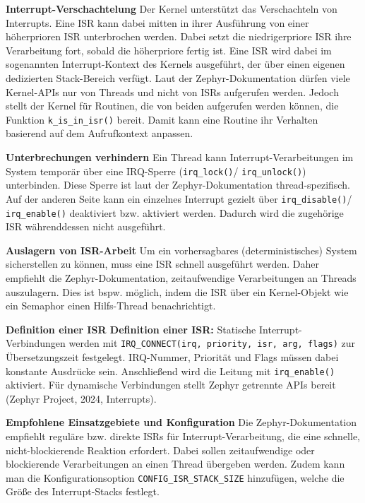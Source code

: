 \textbf{Interrupt-Verschachtelung }Der Kernel unterst{\"u}tzt das Verschachteln von Interrupts. Eine ISR kann dabei mitten in ihrer Ausf{\"u}hrung von einer h{\"o}herprioren ISR unterbrochen werden. Dabei setzt die niedrigerpriore ISR ihre Verarbeitung fort, sobald die h{\"o}herpriore fertig ist. Eine ISR wird dabei im sogenannten \glqq{}Interrupt-Kontext\grqq{} des Kernels ausgef{\"u}hrt, der {\"u}ber einen eigenen dedizierten Stack-Bereich verf{\"u}gt. Laut der Zephyr-Dokumentation d{\"u}rfen viele Kernel-APIs nur von Threads und nicht von ISRs aufgerufen werden. Jedoch stellt der Kernel f{\"u}r Routinen, die von beiden aufgerufen werden k{\"o}nnen, die Funktion \lstinline[style=fileinline]|k_is_in_isr()| bereit. Damit kann eine Routine ihr Verhalten basierend auf dem Aufrufkontext anpassen.

\textbf{Unterbrechungen verhindern }Ein Thread kann Interrupt-Verarbeitungen im System tempor{\"a}r {\"u}ber eine IRQ-Sperre (\lstinline[style=fileinline]|irq_lock()|/ \lstinline[style=fileinline]|irq_unlock()|) unterbinden. Diese Sperre ist laut der Zephyr-Dokumentation thread-spezifisch. Auf der anderen Seite kann ein einzelnes Interrupt gezielt {\"u}ber \lstinline[style=fileinline]|irq_disable()|/ \lstinline[style=fileinline]|irq_enable()| deaktiviert bzw. aktiviert werden. Dadurch wird die zugeh{\"o}rige ISR w{\"a}hrenddessen nicht ausgef{\"u}hrt.

\textbf{Auslagern von ISR-Arbeit }Um ein vorhersagbares (deterministisches) System sicherstellen zu k{\"o}nnen, muss eine ISR schnell ausgef{\"u}hrt werden. Daher empfiehlt die Zephyr-Dokumentation, zeitaufwendige Verarbeitungen an Threads auszulagern. Dies ist bspw. m{\"o}glich, indem die ISR {\"u}ber ein Kernel-Objekt wie ein Semaphor einen Hilfs-Thread benachrichtigt.

\textbf{Definition einer ISR Definition einer ISR:} Statische Interrupt-Verbindungen werden mit \lstinline[style=fileinline]|IRQ_CONNECT(irq, priority, isr, arg, flags)| zur {\"U}bersetzungszeit festgelegt. IRQ-Nummer, Priorit{\"a}t und Flags m{\"u}ssen dabei konstante Ausdr{\"u}cke sein. Anschlie{\ss}end wird die Leitung mit \lstinline[style=fileinline]|irq_enable()| aktiviert. F{\"u}r dynamische Verbindungen stellt Zephyr getrennte APIs bereit (Zephyr Project, 2024, \glqq{}Interrupts\grqq{}).

\textbf{Empfohlene Einsatzgebiete und Konfiguration }Die Zephyr-Dokumentation empfiehlt regul{\"a}re bzw. \glqq{}direkte\grqq{} ISRs f{\"u}r Interrupt-Verarbeitung, die eine schnelle, nicht-blockierende Reaktion erfordert. Dabei sollen zeitaufwendige oder blockierende Verarbeitungen an einen Thread {\"u}bergeben werden. Zudem kann man die Konfigurationsoption \lstinline[style=fileinline]|CONFIG_ISR_STACK_SIZE| hinzuf{\"u}gen, welche die Gr{\"o}{\ss}e des Interrupt-Stacks festlegt.

